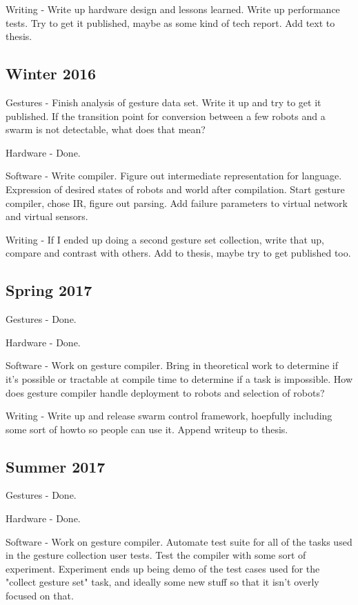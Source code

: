 \documentclass[]{article}
\begin{document}
Writing - Write up hardware design and lessons learned. Write up performance tests. Try to get it published, maybe as some kind of tech report. Add text to thesis.

\subsection{Winter 2016}

Gestures - Finish analysis of gesture data set. Write it up and try to get it published. If the transition point for conversion between a few robots and a swarm is not detectable, what does that mean?

Hardware - Done. 

Software - Write compiler. Figure out intermediate representation for language. Expression of desired states of robots and world after compilation.  Start gesture compiler, chose IR, figure out parsing. Add failure parameters to virtual network and virtual sensors. 

Writing - If I ended up doing a second gesture set collection, write that up, compare and contrast with others. Add to thesis, maybe try to get published too. 

\subsection{Spring 2017}

Gestures - Done. 

Hardware - Done. 

Software - Work on gesture compiler. Bring in theoretical work to determine if it's possible or tractable at compile time to determine if a task is impossible. How does gesture compiler handle deployment to robots and selection of robots?

Writing - Write up and release swarm control framework, hoepfully including some sort of howto so people can use it. Append writeup to thesis. 

\subsection{Summer 2017}

Gestures - Done. 

Hardware - Done. 

Software - Work on gesture compiler. Automate test suite for all of the tasks used in the gesture collection user tests.  Test the compiler with some sort of experiment. Experiment ends up being demo of the test cases used for the "collect gesture set" task, and ideally some new stuff so that it isn't overly focused on that.  
\end{document}

